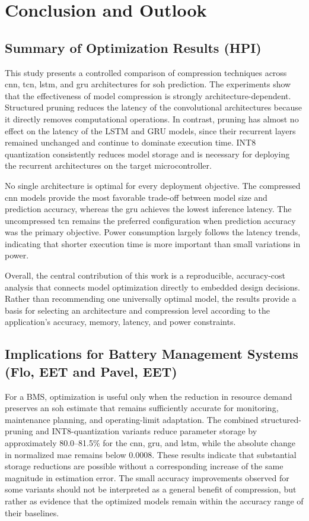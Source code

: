 \documentclass[final,3p,times]{elsarticle}
\begin{document}
\section{Conclusion and Outlook}

\subsection{Summary of Optimization Results (HPI)}

This study presents a controlled comparison of compression techniques across \ac{cnn}, \ac{tcn}, \ac{lstm}, and \ac{gru} architectures for \ac{soh} prediction. The experiments show that the effectiveness of model compression is strongly architecture-dependent. Structured pruning reduces the latency of the convolutional architectures because it directly removes computational
operations. In contrast, pruning has almost no effect on the latency of the
LSTM and GRU models, since their recurrent layers remained unchanged and
continue to dominate execution time. INT8 quantization consistently reduces
model storage and is necessary for deploying the recurrent architectures on
the target microcontroller.

No single architecture is optimal for every deployment objective. The
compressed \ac{cnn} models provide the most favorable trade-off between model size
and prediction accuracy, whereas the \ac{gru} achieves the lowest inference
latency. The uncompressed \ac{tcn} remains the preferred configuration when
prediction accuracy was the primary objective. Power consumption largely
follows the latency trends, indicating that shorter execution time is more
important than small variations in power.

Overall, the central contribution of this work is a reproducible, accuracy-cost analysis that connects model optimization directly to embedded design decisions. Rather than recommending one universally optimal model, the results provide a basis for selecting an architecture and
compression level according to the application's accuracy, memory, latency,
and power constraints.

\subsection{Implications for Battery Management Systems (Flo, EET and Pavel, EET)}
For a BMS, optimization is useful only when the reduction in resource demand preserves an \ac{soh} estimate that remains sufficiently accurate for monitoring, maintenance planning, and operating-limit adaptation. The combined structured-pruning and INT8-quantization variants reduce parameter storage by approximately 80.0--81.5\% for the \ac{cnn}, \ac{gru}, and \ac{lstm}, while the absolute change in normalized \ac{mae} remains below 0.0008. These results indicate that substantial storage reductions are possible without a corresponding increase of the same magnitude in estimation error. The small accuracy improvements observed for some variants should not be interpreted as a general benefit of compression, but rather as evidence that the optimized models remain within the accuracy range of their baselines.
\end{document}
